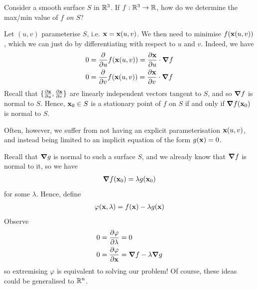 \documentclass{../template/note}
\begin{document}
    Consider a smooth surface $S$ in $\mathbb R^3$. If $f: \mathbb R^3 \to \mathbb R$, how do we determine the max/min value of $f$ \emph{on $S$}?

    Let $(u, v)$ parameterise $S$, i.e. $\V x = \V x(u, v)$. We then need to minimise $f(\V x(u, v))$, which we can just do by differentiating with respect to $u$ and $v$. Indeed, we have
    \begin{align*}
        0 &= \pd{}{u} f(\V x(u, v)) = \pd{\V x}{u} \cdot \grad f \\
        0 &= \pd{}{v} f(\V x(u, v)) = \pd{\V x}{v} \cdot \grad f
    \end{align*}
    Recall that $\{\pd{\V x}{u}, \pd{\V x}{v}\}$ are linearly independent vectors tangent to $S$, and so $\grad f$ is normal to $S$. Hence, $\V x_0 \in S$ is a stationary point of $f$ on $S$ if and only if $\grad f(\V x_0)$ is normal to $S$.

    Often, however, we suffer from not having an explicit parameterisation $\V x(u, v)$, and instead being limited to an implicit equation of the form $g(\V x) = 0$.

    Recall that $\grad g$ is normal to such a surface $S$, and we already know that $\grad f$ is normal to it, so we have
    \begin{align*}
        \grad f(\V x_0) = \lambda g(\V x_0)
    \end{align*}
    for some $\lambda$. Hence, define
    \begin{align*}
        \varphi(\V x, \lambda)  = f(\V x) - \lambda g(\V x)
    \end{align*}
    Observe
    \begin{align*}
        0 &= \pd{\varphi}{\lambda} = 0 \\
        0 &= \pd{\varphi}{\V x} = \grad f - \lambda \grad g
    \end{align*}
    so extremising $\varphi$ is equivalent to solving our problem! Of course, these ideas could be generalised to $\mathbb R^n$.
\end{document}
